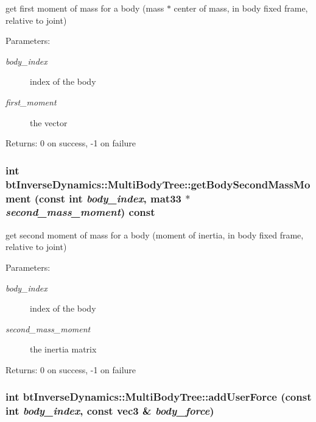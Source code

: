 get first moment of mass for a body (mass $\ast$ center of mass, in body fixed frame, relative to joint) \begin{Desc}
\item[Parameters:]
\begin{description}
\item[{\em body\_\-index}]index of the body \item[{\em first\_\-moment}]the vector \end{description}
\end{Desc}
\begin{Desc}
\item[Returns:]0 on success, -1 on failure \end{Desc}
\hypertarget{classbt_inverse_dynamics_1_1_multi_body_tree_be2ffbd34157198fed40e005f7b154ee}{
\subsubsection[getBodySecondMassMoment]{\setlength{\rightskip}{0pt plus 5cm}int btInverseDynamics::MultiBodyTree::getBodySecondMassMoment (const int {\em body\_\-index}, \/  mat33 $\ast$ {\em second\_\-mass\_\-moment}) const}}
\label{classbt_inverse_dynamics_1_1_multi_body_tree_be2ffbd34157198fed40e005f7b154ee}


get second moment of mass for a body (moment of inertia, in body fixed frame, relative to joint) \begin{Desc}
\item[Parameters:]
\begin{description}
\item[{\em body\_\-index}]index of the body \item[{\em second\_\-mass\_\-moment}]the inertia matrix \end{description}
\end{Desc}
\begin{Desc}
\item[Returns:]0 on success, -1 on failure \end{Desc}
\hypertarget{classbt_inverse_dynamics_1_1_multi_body_tree_629ed5024a2d1cb7500ebe935231f5e8}{
\subsubsection[addUserForce]{\setlength{\rightskip}{0pt plus 5cm}int btInverseDynamics::MultiBodyTree::addUserForce (const int {\em body\_\-index}, \/  const {\bf vec3} \& {\em body\_\-force})}}
\label{classbt_inverse_dynamics_1_1_multi_body_tree_629ed5024a2d1cb7500ebe935231f5e8}


